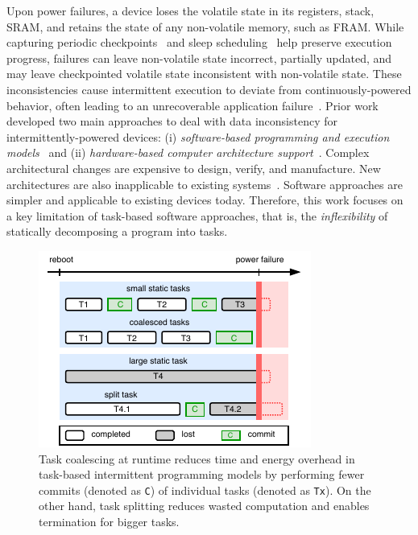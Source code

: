 Upon power failures, a device loses the volatile
state in its registers, stack, SRAM, and retains the state of any non-volatile
memory, such as FRAM. While capturing periodic
checkpoints~\cite{mementos,quickrecall} and sleep
scheduling~\cite{dewdrop,hibernus,hibernusplusplus} help preserve execution
progress, failures can leave non-volatile state incorrect, partially updated,
and may leave checkpointed volatile state inconsistent with non-volatile state.
These inconsistencies cause intermittent execution to deviate from
continuously-powered behavior, often leading to an unrecoverable
application failure~\cite{dino,edb}. Prior work developed two main approaches to deal with data inconsistency for
intermittently-powered devices: (i) \emph{software-based programming and
execution models}~\cite{dino,ratchet,chain,alpaca} and (ii)
\emph{hardware-based computer architecture
support}~\cite{hicks_isca_2017,idetic,nvp}. Complex architectural changes are
expensive to design, verify, and manufacture. New architectures are also
inapplicable to existing systems~\cite{hicks_isca_2017,nvp}. Software
approaches are simpler and applicable to existing devices today. Therefore, this work focuses on a key limitation of task-based software approaches, that is, the {\em inflexibility} of statically decomposing a program into tasks.

%
\begin{figure}
    \centering
    \includegraphics[width=0.7\columnwidth]{figures/intro-figure-vert.pdf}
    \caption{ Task coalescing at runtime reduces time and energy overhead in task-based intermittent programming models by performing fewer commits (denoted as \texttt{C}) of individual tasks (denoted as \texttt{Tx}). On the other hand, task splitting reduces wasted computation and enables termination for bigger tasks.}
    \label{fig:coalesce}
\end{figure}
%

